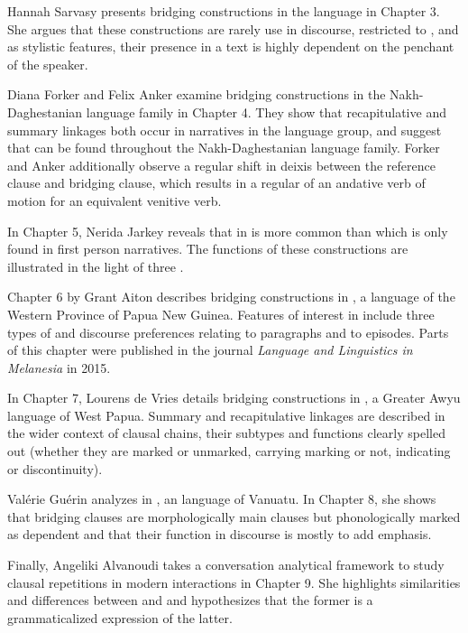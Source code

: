 \begin{refsection}
Hannah Sarvasy presents bridging constructions in the  language  in Chapter 3. She argues that these constructions are rarely use in  discourse, restricted to , and as stylistic features, their presence in a text is highly dependent on the penchant of the speaker. 

Diana Forker and Felix Anker examine bridging constructions in the Nakh-Daghestanian language family in Chapter 4. They show that recapitulative and summary linkages both occur in narratives in the  language group, and suggest that  can be found throughout the Nakh-Daghestanian language family. Forker and Anker additionally observe a regular shift in deixis between the reference clause and bridging clause, which results in a regular  of an andative verb of motion for an equivalent venitive verb. 

In Chapter 5, Nerida Jarkey reveals that in   is more common than  which is only found in first person narratives. The functions of these constructions are illustrated in the light of three . 

Chapter 6 by Grant Aiton describes bridging constructions in , a language of the Western Province of Papua New Guinea. Features of interest in  include three types of  and discourse preferences relating  to paragraphs and  to episodes. Parts of this chapter were published in the journal \textit{Language and Linguistics in Melanesia} in 2015. 

In Chapter 7, Lourens de Vries details bridging constructions in , a Greater Awyu language of West Papua. Summary and recapitulative linkages are described in the wider context of clausal chains, their subtypes and functions clearly spelled out (whether they are marked or unmarked, carrying  marking or not, indicating  or discontinuity). 

Valérie Guérin analyzes  in , an  language of Vanuatu. In Chapter 8, she shows that bridging clauses are morphologically main clauses but phonologically marked as dependent and that their function in discourse is mostly to add emphasis. 

Finally, Angeliki Alvanoudi takes a conversation analytical framework to study clausal repetitions in modern  interactions in Chapter 9. She highlights similarities and differences between  and  and hypothesizes that the former is a grammaticalized expression of the latter. 




\end{refsection}
